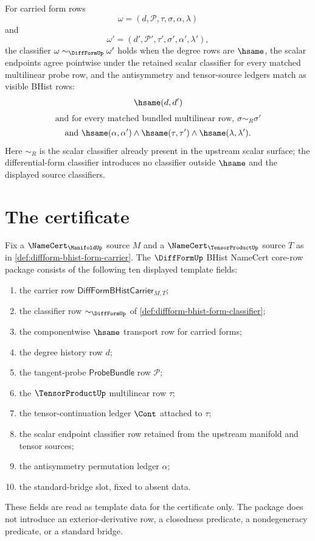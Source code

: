 \begin{definition}
\label{def:diffform-bhist-form-classifier}
For carried form rows
$$
\omega=(d,\mathcal{P},\tau,\sigma,\alpha,\lambda)
$$
and
$$
\omega'=(d',\mathcal{P}',\tau',\sigma',\alpha',\lambda'),
$$
the classifier $\omega\sim_{\DiffFormUp}\omega'$ holds when the degree rows
are $\hsame$, the scalar endpoints agree pointwise under the retained scalar
classifier for every matched multilinear probe row, and the antisymmetry and
tensor-source ledgers match as visible BHist rows:
$$
\hsame(d,d')
$$
$$
\text{and for every matched bundled multilinear row, }
\sigma\sim_R\sigma'
$$
$$
\text{and }
\hsame(\alpha,\alpha')\wedge\hsame(\tau,\tau')
\wedge\hsame(\lambda,\lambda').
$$
Here $\sim_R$ is the scalar classifier already present in the upstream scalar
surface; the differential-form classifier introduces no classifier outside
$\hsame$ and the displayed source classifiers.
\end{definition}

\section{The certificate}
\label{sec:diffform-certificate}

\begin{definition}
\label{def:diffform-bhist-namecert-core-rows}
Fix a $\NameCert_{\ManifoldUp}$ source $M$ and a
$\NameCert_{\TensorProductUp}$ source $T$ as in
\autoref{def:diffform-bhist-form-carrier}. The $\DiffFormUp$ BHist
NameCert core-row package consists of the following ten displayed template
fields:
\begin{enumerate}
  \item the carrier row
  $\mathsf{DiffFormBHistCarrier}_{M,T}$;
  \item the classifier row $\sim_{\DiffFormUp}$ of
  \autoref{def:diffform-bhist-form-classifier};
  \item the componentwise $\hsame$ transport row for carried forms;
  \item the degree history row $d$;
  \item the tangent-probe $\mathsf{ProbeBundle}$ row $\mathcal{P}$;
  \item the $\TensorProductUp$ multilinear row $\tau$;
  \item the tensor-continuation ledger $\Cont$ attached to $\tau$;
  \item the scalar endpoint classifier row retained from the upstream
  manifold and tensor sources;
  \item the antisymmetry permutation ledger $\alpha$;
  \item the standard-bridge slot, fixed to absent data.
\end{enumerate}
These fields are read as template data for the certificate only. The package
does not introduce an exterior-derivative row, a closedness predicate, a
nondegeneracy predicate, or a standard bridge.
\end{definition}

